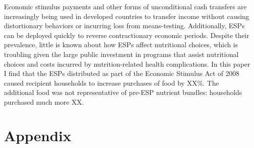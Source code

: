 \documentclass[12pt]{article}
\begin{document}
Economic stimulus payments and other forms of unconditional cash transfers are increasingly being used in developed countries to transfer income without causing distortionary behaviors or incurring loss from means-testing. Additionally, ESPs can be deployed quickly to reverse contractionary economic periods. Despite their prevalence, little is known about how ESPs affect nutritional choices, which is troubling given the large public investment in programs that assist nutritional choices and costs incurred by nutrition-related health complications. In this paper I find that the ESPs distributed as part of the Economic Stimulus Act of 2008 caused recipient households to increase purchases of food by XX\%. The additional food was not representative of pre-ESP nutrient bundles: households purchased much more XX.

\clearpage
\printbibliography


\singlespacing

% 




\clearpage
\section*{Appendix}

\renewcommand{\thesubsection}{\Alph{subsection}}
\setcounter{table}{0}
\renewcommand{\thetable}{A\arabic{table}}
\setcounter{figure}{0}
\renewcommand{\thefigure}{A\arabic{figure}}
\end{document}

